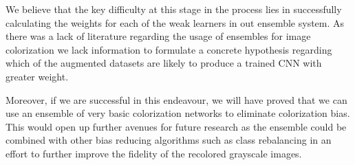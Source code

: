 \documentclass[10pt,twocolumn,letterpaper]{article}
\begin{document}
We believe that the key difficulty at this stage in the process lies in successfully calculating the weights for each of the weak learners in out ensemble system. As there was a lack of literature regarding the usage of ensembles for image colorization we lack information to formulate a concrete hypothesis regarding which of the augmented datasets are likely to produce a trained CNN with greater weight.

Moreover, if we are successful in this endeavour, we will have proved that we can use an ensemble of very basic colorization networks to eliminate colorization bias. This would open up further avenues for future research as the ensemble could be combined with other bias reducing algorithms such as class rebalancing\cite{Zhang2016} in an effort to further improve the fidelity of the recolored grayscale images.

{\small


}
\end{document}

